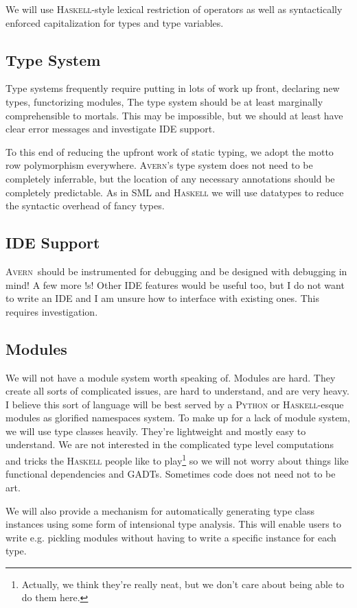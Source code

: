 \documentclass[]{article}
\newcommand{\avern}{\textsc{Avern}}
\begin{document}
We will use \textsc{Haskell}-style lexical restriction of operators as well as syntactically enforced capitalization for types and type variables.

\subsection{Type System}
Type systems frequently require putting in lots of work up front, declaring new types, functorizing modules, The type system should be at least marginally comprehensible to mortals. This may be impossible, but we should at least have clear error messages and investigate IDE support.

To this end of reducing the upfront work of static typing, we adopt the motto row polymorphism everywhere. \avern's type system does not need to be completely inferrable, but the location of any necessary annotations should be completely predictable. As in \textsc{SML} and \textsc{Haskell} we will use datatypes to reduce the syntactic overhead of fancy types.

\subsection{IDE Support}
\avern\ should be instrumented for debugging and be designed with debugging in mind! A few more !s! Other IDE features would be useful too, but I do not want to write an IDE and I am unsure how to interface with existing ones. This requires investigation.

\subsection{Modules}
We will not have a module system worth speaking of. Modules are hard. They create all sorts of complicated issues, are hard to understand, and are very heavy. I believe this sort of language will be best served by a \textsc{Python} or \textsc{Haskell}-esque modules as glorified namespaces system. To make up for a lack of module system, we will use type classes heavily. They're lightweight and mostly easy to understand. We are not interested in the complicated type level computations and tricks the \textsc{Haskell} people like to play\footnote{Actually, we think they're really neat, but we don't care about being able to do them here.} so we will not worry about things like functional dependencies and GADTs. Sometimes code does not need not to be art.

We will also provide a mechanism for automatically generating type class instances using some form of intensional type analysis. This will enable users to write e.g. pickling modules without having to write a specific instance for each type.
\end{document}
